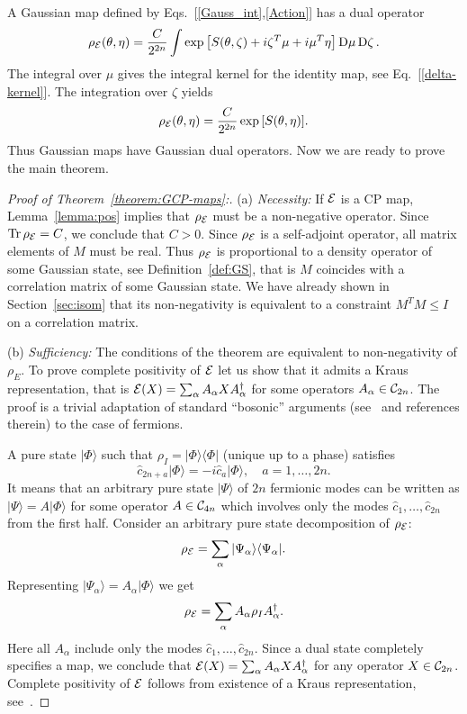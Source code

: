 \documentclass[twocolumn,showpacs,preprintnumbers,superscriptaddress]{revtex4}
\newcommand{\calE}{{\cal E }}
\newcommand{\Clif}{{\cal C}}
\newcommand{\la}{\langle}
\newcommand{\ra}{\rangle}
\newcommand{\D}[1]{\mathop{\mathrm{D}#1}}
\newcommand{\be}{\begin{equation}}
\newcommand{\ee}{\end{equation}}
\newcommand{\cop}{{\hat{c}}}
\DeclareMathOperator*{\tr}{\mathop{\mathrm{Tr}}}
\begin{document}
A Gaussian map  defined by Eqs.~[\ref{Gauss_int},\ref{Action}] has a dual
operator 
\[
\rho_{\calE}(\theta,\eta)= \frac{C}{2^{2n}}
\int
\exp{\left[
S(\theta,\zeta) + i\zeta^T\mu + i\mu^T\eta\right]}
\D{\mu}\D{\zeta}.
\]
The integral over $\mu$ gives the integral kernel for the identity map,
see Eq.~[\ref{delta-kernel}]. The integration over $\zeta$ yields
\be\label{g-function}
\rho_{\calE}(\theta,\eta)= \frac{C}{2^{2n}} 
\exp{\left[
S(\theta,\eta)
\right]}.
\ee
Thus Gaussian maps have  Gaussian dual operators.
Now we are ready to prove the main theorem.
\begin{proof}[Proof of Theorem~\ref{theorem:GCP-maps}:]
(a) {\it Necessity:}
If $\calE$ is a CP map, Lemma~\ref{lemma:pos} implies that
$\rho_{\calE}$ must be a non-negative operator. Since $\tr{\rho_{\calE}}=C$, we 
conclude that $C>0$. Since $\rho_{\calE}$ is a self-adjoint operator,
all matrix elements of $M$ must be real. Thus
$\rho_{\calE}$ is proportional to a density operator
of some Gaussian state, see Definition~\ref{def:GS}, that is
$M$ coincides with a correlation matrix of some Gaussian state.
We have already shown in Section~\ref{sec:isom} that its non-negativity
is equivalent to a constraint $M^T M \le I$ on a correlation matrix.


\noindent
(b) {\it Sufficiency:} 
The conditions of the theorem are equivalent
to non-negativity of $\rho_E$. 
To prove complete positivity of $\calE$ 
let us show that it admits a Kraus
representation, that is $\calE(X)=\sum_\alpha A_\alpha X A_{\alpha}^\dag$
for some operators $A_{\alpha}\in \Clif_{2n}$. The proof is a trivial adaptation of
standard ``bosonic'' arguments (see~\cite{VV02} and references therein)
to the case of fermions.

A pure state $|\Phi\ra$  such that $\rho_I=|\Phi\ra\la \Phi|$
(unique up to a phase) satisfies 
\[
\cop_{2n+a}|\Phi\ra=-i\cop_a |\Phi\ra, \quad a=1,\ldots,2n.
\]
It means that an arbitrary pure state $|\Psi\ra$ of $2n$ fermionic modes
can be written as $|\Psi\ra=A|\Phi\ra$ for some operator $A\in \Clif_{4n}$
which involves only the modes $\cop_1,\ldots,\cop_{2n}$ from the first half.
Consider an arbitrary pure state decomposition of $\rho_{\calE}$:
\[
\rho_{\calE}=\sum_\alpha |\Psi_\alpha\ra\la \Psi_\alpha|.
\]
Representing $|\Psi_\alpha\ra= A_\alpha |\Phi\ra$ we get
\[
\rho_{\calE}=\sum_\alpha A_\alpha \rho_I A_{\alpha}^\dag.
\]
Here all $A_{\alpha}$ include only the modes $\cop_1,\ldots,\cop_{2n}$.
Since a dual state completely specifies a map, we conclude that
$\calE(X)=\sum_\alpha A_\alpha X A_\alpha^\dag$ for any operator 
$X\in \Clif_{2n}$.
Complete positivity of $\calE$ follows from 
existence of a Kraus  representation, see~\cite{Choi75}.
\end{proof}
\end{document}
